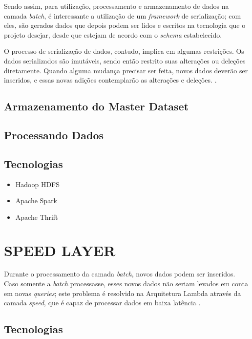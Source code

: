 Sendo assim, para utilização, processamento e armazenamento de dados na
camada \textit{batch}, é interessante a utilização de um \textit{framework}
de serialização; com eles, são gerados dados que depois podem ser lidos
e escritos na tecnologia que o projeto desejar, desde que estejam de acordo
com o \textit{schema} estabelecido.

O processo de serialização de dados, contudo, implica em algumas restrições.
Os dados serializados são imutáveis, sendo então restrito suas alterações ou
deleções diretamente. Quando alguma mudança precisar ser feita, novos dados
deverão ser inseridos, e essas novas adições contemplarão as alterações 
e deleções.
\cite{marz2015}.

\subsection{Armazenamento do Master Dataset}

\subsection{Processando Dados}

\subsection{Tecnologias}

\begin{itemize}
  \item Hadoop HDFS
  \item Apache Spark
  \item Apache Thrift
\end{itemize}

\section{SPEED LAYER}

Durante o processamento da camada \textit{batch}, novos dados podem ser
inseridos. Caso somente a \textit{batch} processasse, esses novos dados não
seriam levados em conta em novas \textit{queries}; este problema é resolvido
na Arquitetura Lambda através da camada \textit{speed}, que é capaz de
processar dados em baixa latência \cite{marz2015}.

\subsection{Tecnologias}

